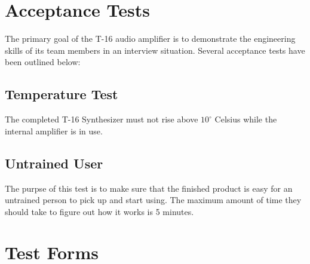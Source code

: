 \documentclass{article}
\begin{document}
\newpage
\section{Acceptance Tests}
The primary goal of the T-16 audio amplifier is to demonstrate the
engineering skills of its team members in an interview
situation. Several acceptance tests have been outlined below:

\subsection{Temperature Test}
The completed T-16 Synthesizer must not rise above $10^\circ$ Celsius
while the internal amplifier is in use.
\subsection{Untrained User}
	The purpse of this test is to make sure that the finished product is easy
	for an untrained person to pick up and start using. The maximum amount of
	time they should take to figure out how it works is 5 minutes.

\section {Test Forms}
\end{document}
